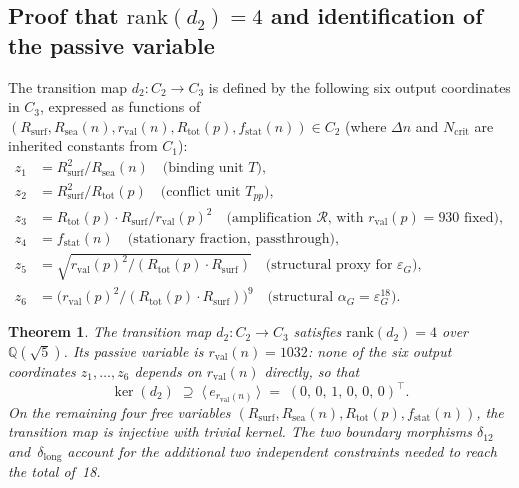 \documentclass[11pt,a4paper]{article}
\newtheorem{theorem}{Theorem}[section]
\theoremstyle{definition}
\newcommand{\Rsurf}{R_{\mathrm{surf}}}
\newcommand{\Rsea}{R_{\mathrm{sea}}}
\newcommand{\Rtot}{R_{\mathrm{tot}}}
\newcommand{\rval}{r_{\mathrm{val}}}
\newcommand{\epsg}{\varepsilon_G}
\newcommand{\rank}{\mathrm{rank}}
\newcommand{\dmap}[1]{d_{#1}}
\newcommand{\dlong}{\delta_{\mathrm{long}}}
\newcommand{\calR}{\mathcal{R}}
\begin{document}
\subsection{Proof that \texorpdfstring{$\rank(\dmap{2}) = 4$}{rank(d2) = 4} and identification of the passive variable}
\label{subsec:rank_d2}

The transition map $\dmap{2} : C_2 \to C_3$ is defined by the following six output coordinates in $C_3$, expressed as functions of $(\Rsurf, \Rsea(n), \rval(n), \Rtot(p), f_{\mathrm{stat}}(n)) \in C_2$ (where $\Delta n$ and $N_{\mathrm{crit}}$ are inherited constants from $C_1$):
\begin{align*}
  z_1 &= \Rsurf^2/\Rsea(n) \quad\text{(binding unit $T$)}, \\
  z_2 &= \Rsurf^2/\Rtot(p) \quad\text{(conflict unit $T_{pp}$)}, \\
  z_3 &= \Rtot(p) \cdot \Rsurf / \rval(p)^2 \quad\text{(amplification $\calR$, with $\rval(p)=930$ fixed)}, \\
  z_4 &= f_{\mathrm{stat}}(n) \quad\text{(stationary fraction, passthrough)}, \\
  z_5 &= \sqrt{\rval(p)^2/(\Rtot(p) \cdot \Rsurf)} \quad\text{(structural proxy for $\epsg$)}, \\
  z_6 &= \bigl(\rval(p)^2/(\Rtot(p) \cdot \Rsurf)\bigr)^9 \quad\text{(structural $\alpha_G = \epsg^{18}$)}.
\end{align*}

\begin{theorem}
  \label{thm:rank_d2}
  The transition map $\dmap{2} : C_2 \to C_3$ satisfies $\rank(\dmap{2}) = 4$ over $\mathbb{Q}(\sqrt{5})$. Its passive variable is $\rval(n) = 1032$: none of the six output coordinates $z_1, \ldots, z_6$ depends on $\rval(n)$ directly, so that
  \[
    \ker(\dmap{2}) \;\supseteq\; \bigl\langle\, e_{\rval(n)} \,\bigr\rangle \;=\; (0,\,0,\,1,\,0,\,0,\,0)^{\!\top}.
  \]
  On the remaining four free variables $(\Rsurf, \Rsea(n), \Rtot(p), f_{\mathrm{stat}}(n))$, the transition map is injective with trivial kernel. The two boundary morphisms $\delta_{12}$ and~$\dlong$ account for the additional two independent constraints needed to reach the total of~18.
\end{theorem}
\end{document}
